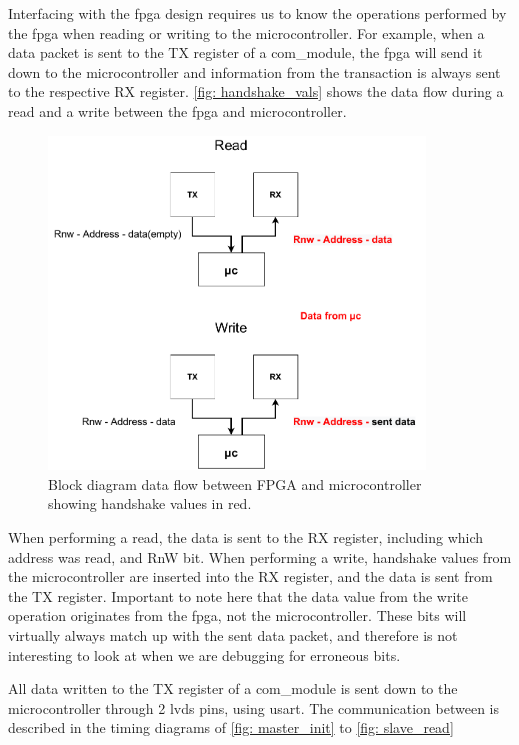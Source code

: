 \documentclass[main.tex]{subfiles}
\begin{document}
Interfacing with the \gls{fpga} design requires us to know the operations performed by the \gls{fpga} when reading or writing to the microcontroller. For example, when a data packet is sent to the TX register of a com\_module, the \gls{fpga} will send it down to the microcontroller and information from the transaction is always sent to the respective RX register. \autoref{fig: handshake_vals} shows the data flow during a read and a write between the \gls{fpga} and microcontroller.

\begin{figure}[!htpb]
    \centering
    \includegraphics[width=10cm, scale=1]{images/handshake procedure.pdf}
    \caption{Block diagram data flow between FPGA and microcontroller showing handshake values in red.}
    \label{fig: handshake_vals}
\end{figure}
\FloatBarrier

When performing a read, the data is sent to the RX register, including which address was read, and RnW bit. When performing a write, handshake values from the microcontroller are inserted into the RX register, and the data is sent from the TX register. Important to note here that the data value from the write operation originates from the \gls{fpga}, not the microcontroller. These bits will virtually always match up with the sent data packet, and therefore is not interesting to look at when we are debugging for erroneous bits.

All data written to the TX register of a com\_module is sent down to the microcontroller through 2 \gls{lvds} pins, using \acrshort{usart}. The communication between is described in the timing diagrams\cite{birger} of \autoref{fig: master_init} to \autoref{fig: slave_read}
\end{document}
